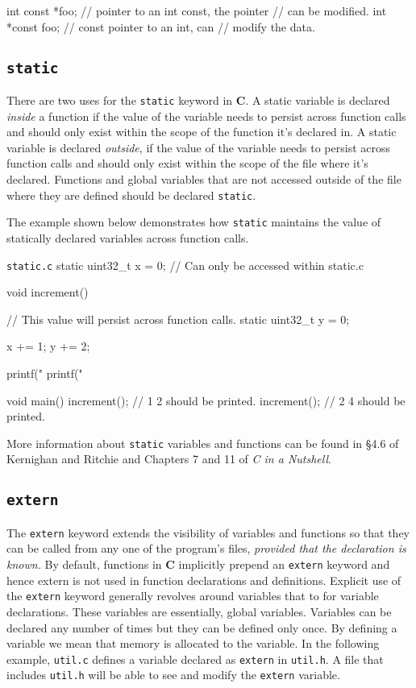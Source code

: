 \documentclass[11pt]{article}
\begin{document}
\begin{codelisting}{}
int const *foo; // pointer to an int const, the pointer
                // can be modified.
int *const foo; // const pointer to an int, can
                // modify the data.
\end{codelisting}


\subsection{\texttt{static}}

There are two uses for the \texttt{static} keyword in \textbf{C}. A static
variable is declared \emph{inside} a function if the value of the variable needs
to persist across function calls and should only exist within the scope of the
function it's declared in. A static variable is declared \emph{outside}, if the
value of the variable needs to persist across function calls and should only
exist within the scope of the file where it's declared.  Functions and global
variables that are not accessed outside of the file where they are defined
should be declared \texttt{static}.

The example shown below demonstrates how \texttt{static} maintains the value of
statically declared variables across function calls.

\begin{codelisting}{\texttt{static.c}}
static uint32_t x = 0; // Can only be accessed within static.c

void increment() {
    // This value will persist across function calls.
    static uint32_t y = 0;

    x += 1;
    y += 2;

    printf("%
    printf("%
}

void main() {
    increment(); // 1 2 should be printed.
    increment(); // 2 4 should be printed.
}
\end{codelisting}

More information about \texttt{static} variables and functions can be found in
\S 4.6 of Kernighan and Ritchie and Chapters 7 and 11 of \emph{C in a Nutshell}.


\subsection{\texttt{extern}}

The \texttt{extern} keyword extends the visibility of variables and functions so
that they can be called from any one of the program's files, \emph{provided that
the declaration is known.} By default, functions in \textbf{C} implicitly
prepend an \texttt{extern} keyword and hence extern is not used in function declarations and definitions.
Explicit use of the \texttt{extern} keyword generally revolves around variables that to for variable declarations.
These variables are essentially, global variables. Variables can be declared any number of times but they can
be defined only once.  By defining a variable we mean that memory is allocated to the variable. In the following
example, \texttt{util.c} defines a variable declared as \texttt{extern} in \texttt{util.h}. A file that includes \texttt{util.h}
will be able to see and modify the \texttt{extern} variable.
\end{document}
